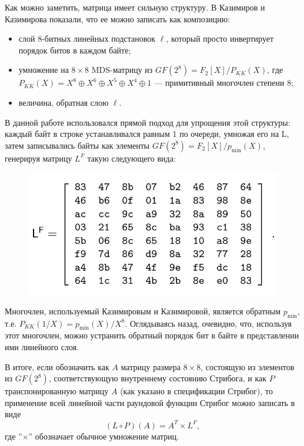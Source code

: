 Как можно заметить, матрица имеет сильную структуру. В \cite{KK13} Казимиров и Казимирова показали, что ее можно записать как композицию:
\begin{itemize}
    \item слой 8-битных линейных подстановок \(\ell\), который просто инвертирует порядок битов в каждом байте;
    \item умножение на $8 \times 8$ MDS-матрицу из $GF(2^8) = F_2[X]/P_{KK}(X)$, где \(P_{KK}(X) = X^8 \oplus X^6 \oplus X^5 \oplus X^4 \oplus 1\) — примитивный многочлен степени 8;
    \item величина, обратная слою \(\ell\).
\end{itemize}

В данной работе использовался прямой подход для упрощения этой структуры: каждый байт в строке устанавливался равным 1 по очереди, умножая его на L, затем записывались байты как элементы $GF(2^8) = F_2[X]/p_{\text{min}}(X)$, генерируя матрицу $L^F$ такую следующего вида:
\begin{figure}
  \centering
  \includegraphics[scale=0.9]{contents/pics/LF_matrix.png}
\end{figure}

Многочлен, используемый Казимировым и Казимировой, является обратным \(p_{\text{min}}\), т.е. \(P_{KK}(1/X) = p_{\text{min}}(X)/X^8\). Оглядываясь назад, очевидно, что, используя этот многочлен, можно устранить обратный порядок бит в байте в представлении ими линейного слоя.

В итоге, если обозначить как $A$ матрицу размера $8 \times 8$, состоящую из элементов из $GF(2^8)$, соответствующую внутреннему состоянию Стрибога, и как $P$ транспонированную матрицу $A$ (как указано в спецификации Стрибог), то применение всей линейной части раундовой функции Стрибог можно записать в виде
\[
(L \circ P)(A) = A^T \times L^F,
\]
где ''$\times$'' обозначает обычное умножение матриц.

